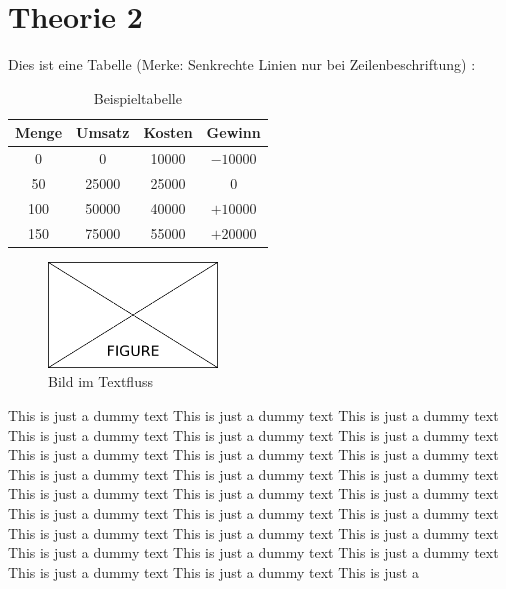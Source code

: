 \section{Theorie 2}
\label{sec:theorieB}

Dies ist eine Tabelle (Merke: Senkrechte Linien nur bei Zeilenbeschriftung)  :

\medskip
\begin{table}[H]
	\centering
	{\renewcommand{\arraystretch}{1.5}
		\begin{tabular}{cccc}
			\toprule 
			Menge & Umsatz & Kosten & Gewinn \\ \midrule 
			0 & 0 & 10000 & $-10000$ \\ %
			50 & 25000 & 25000 & 0 \\ %
			100 & 50000 & 40000 & $+10000$ \\ %
			150 & 75000 & 55000 & $+20000$ \\
			\bottomrule 
		\end{tabular}
	}
	\caption{Beispieltabelle}
	\label{tab:BSP}
\end{table}

\begin{figure}
	\centering
	\includegraphics[width=0.4\textwidth]{Content/Figures/figure.png}
	\caption{Bild im Textfluss}
	\label{fig:test}
\end{figure}

This is just a dummy text This is just a dummy text This is just a dummy text This is just a dummy text This is just a dummy text This is just a dummy text
This is just a dummy text This is just a dummy text This is just a dummy text This is just a dummy text This is just a dummy text This is just a dummy text This is just a dummy text This is just a dummy text This is just a dummy text This is just a dummy text This is just a dummy text This is just a dummy text This is just a dummy text This is just a dummy text This is just a dummy text This is just a dummy text This is just a dummy text This is just a dummy text This is just a dummy text This is just a dummy text This is just a

